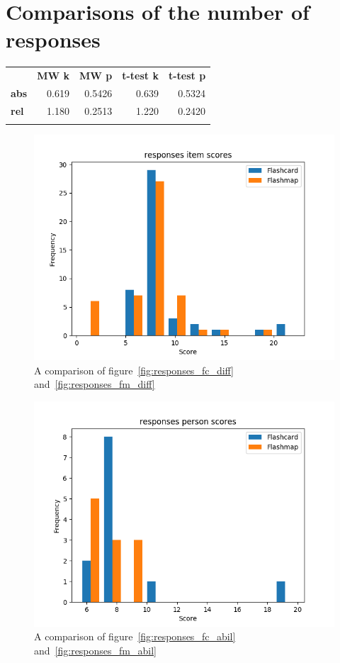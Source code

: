 \FloatBarrier
\section{Comparisons of the number of responses}

\begin{longtable}[c]{@{}lrrrr@{}}
\toprule\addlinespace
& \textbf{MW k} & \textbf{MW p} &
\textbf{t-test k} & \textbf{t-test p}
\\\addlinespace
\midrule
\textbf{abs} & 0.619 & 0.5426 & 0.639 & 0.5324
\\\addlinespace
\textbf{rel} & 1.180 & 0.2513 & 1.220 & 0.2420
\\\addlinespace
\bottomrule
    \label{tab:responses_comp}
\end{longtable}

\begin{figure}
    \includegraphics[width=\textwidth]{img/responses_diff.png}
    \caption{A comparison of figure~\protect\ref{fig:responses_fc_diff} and~\protect\ref{fig:responses_fm_diff}}
    \label{fig:responses_diff}
\end{figure}
\begin{figure}
    \includegraphics[width=\textwidth]{img/responses_abil.png}
    \caption{A comparison of figure~\protect\ref{fig:responses_fc_abil} and~\protect\ref{fig:responses_fm_abil}}
    \label{fig:responses_abil}
\end{figure}

